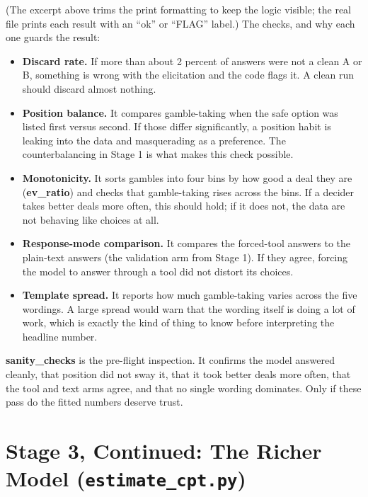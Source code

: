 \documentclass[11pt]{article}
\newcommand{\file}[1]{\textbf{\ttfamily #1}}
\begin{document}
(The excerpt above trims the print formatting to keep the logic visible; the real file prints each
result with an ``ok'' or ``FLAG'' label.) The checks, and why each one guards the result:

\begin{itemize}
\item \textbf{Discard rate.} If more than about 2 percent of answers were not a clean A or B, something
is wrong with the elicitation and the code flags it. A clean run should discard almost nothing.
\item \textbf{Position balance.} It compares gamble-taking when the safe option was listed first versus
second. If those differ significantly, a position habit is leaking into the data and masquerading as a
preference. The counterbalancing in Stage 1 is what makes this check possible.
\item \textbf{Monotonicity.} It sorts gambles into four bins by how good a deal they are (\file{ev\_ratio})
and checks that gamble-taking rises across the bins. If a decider takes better deals more often, this
should hold; if it does not, the data are not behaving like choices at all.
\item \textbf{Response-mode comparison.} It compares the forced-tool answers to the plain-text answers
(the validation arm from Stage 1). If they agree, forcing the model to answer through a tool did not
distort its choices.
\item \textbf{Template spread.} It reports how much gamble-taking varies across the five wordings. A
large spread would warn that the wording itself is doing a lot of work, which is exactly the kind of
thing to know before interpreting the headline number.
\end{itemize}

\begin{plainbox}
\file{sanity\_checks} is the pre-flight inspection. It confirms the model answered cleanly, that
position did not sway it, that it took better deals more often, that the tool and text arms agree, and
that no single wording dominates. Only if these pass do the fitted numbers deserve trust.
\end{plainbox}

\section{Stage 3, Continued: The Richer Model (\texttt{estimate\_cpt.py})}
\end{document}
